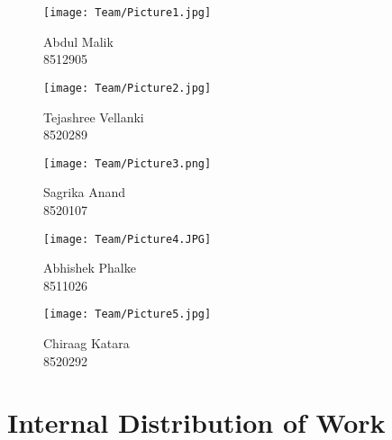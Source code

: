 \begin{figure}[h]
    \centering
    \begin{minipage}{0.3\textwidth}
        \centering
        \texttt{[image: Team/Picture1.jpg]}
        \caption*{Abdul Malik\\8512905}
    \end{minipage}
    \hfill
    \begin{minipage}{0.3\textwidth}
        \centering
        \texttt{[image: Team/Picture2.jpg]}
        \caption*{Tejashree Vellanki\\8520289}
    \end{minipage}
    \hfill
    \begin{minipage}{0.3\textwidth}
        \centering
        \texttt{[image: Team/Picture3.png]}
        \caption*{Sagrika Anand\\8520107}
    \end{minipage}
    
    \vspace{0.5cm}
    \begin{minipage}{0.3\textwidth}
        \centering
        \texttt{[image: Team/Picture4.JPG]}
        \caption*{Abhishek Phalke\\8511026}
    \end{minipage}
    \hspace{0.5cm}
    \begin{minipage}{0.3\textwidth}
        \centering
        \texttt{[image: Team/Picture5.jpg]}
        \caption*{Chiraag Katara\\8520292}
    \end{minipage}
\end{figure}

\section*{Internal Distribution of Work}

